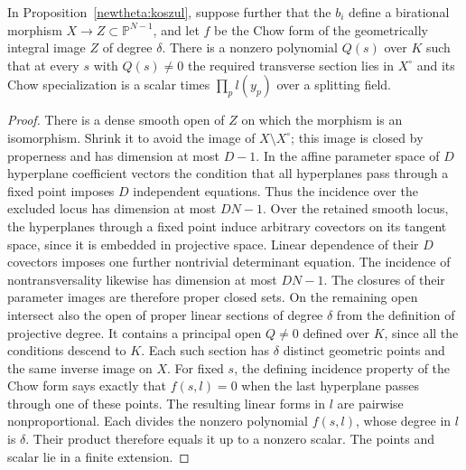 \begin{lemma}\label{newtheta:pencil}
In Proposition~\ref{newtheta:koszul}, suppose further that the \(b_i\)
define a birational morphism \(X\to Z\subset\mathbb P^{N-1}\), and
let \(f\) be the Chow form of the geometrically integral image \(Z\)
of degree \(\delta\). There is a nonzero polynomial \(Q(s)\) over
\(K\) such that at every \(s\) with \(Q(s)\ne0\) the required transverse
section lies in \(X^\circ\) and its Chow specialization is a scalar
times \(\prod_p l(y_p)\) over a splitting field.
\end{lemma}
\begin{proof}
There is a dense smooth open of \(Z\) on which the morphism is an
isomorphism. Shrink it to avoid the image of \(X\setminus X^\circ\);
this image is closed by properness and has dimension at most \(D-1\).
In the affine parameter space of \(D\) hyperplane coefficient vectors
the condition that all hyperplanes pass through a fixed point imposes
\(D\) independent equations. Thus the incidence over the excluded
locus has dimension at most \(DN-1\). Over the retained smooth locus,
the hyperplanes through a fixed point induce arbitrary covectors on
its tangent space, since it is embedded in projective space. Linear
dependence of their \(D\) covectors imposes one further nontrivial
determinant equation. The incidence of nontransversality likewise has
dimension at most \(DN-1\). The closures of their parameter images
are therefore proper closed sets. On the remaining open intersect also
the open of proper linear sections of degree \(\delta\) from the
definition of projective degree. It contains a principal open \(Q\ne0\)
defined over \(K\), since all the conditions descend to \(K\).
Each such section has \(\delta\) distinct geometric points and the
same inverse image on \(X\). For fixed \(s\), the defining incidence
property of the Chow form says exactly that \(f(s,l)=0\) when the
last hyperplane passes through one of these points. The resulting
linear forms in \(l\) are pairwise nonproportional. Each divides the
nonzero polynomial \(f(s,l)\), whose degree in \(l\) is \(\delta\).
Their product therefore equals it up to a nonzero scalar. The points
and scalar lie in a finite extension.
\end{proof}

